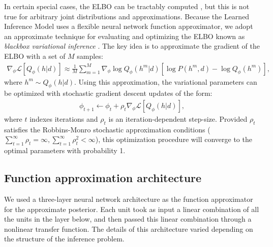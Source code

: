 In certain special cases, the ELBO can be tractably computed \citep[see][]{jordan1999introduction}, but this is not true for arbitrary joint distributions and approximations. Because the Learned Inference Model uses a flexible neural network function approximator, we adopt an approximate technique for evaluating and optimizing the ELBO known as \emph{blackbox variational inference} \citep{ranganath2014black}. The key idea is to approximate the gradient of the ELBO with a set of $M$ samples:
\begin{align}
    \nabla_\phi \mathcal{L}[Q_\phi(h|d)] \approx \frac{1}{M} \sum_{m=1}^M \nabla_\phi \log Q_\phi(h^m|d) \left[ \log P(h^m,d) - \log Q_\phi(h^m) \right],
\end{align}
where $h^m \sim Q_\phi(h|d)$. Using this approximation, the variational parameters can be optimized with stochastic gradient descent updates of the form:
\begin{align}
    \phi_{t+1} \leftarrow \phi_t + \rho_t \nabla_\phi \mathcal{L}[Q_\phi(h|d)],
\end{align}
where $t$ indexes iterations and $\rho_t$ is an iteration-dependent step-size. Provided $\rho_t$ satisfies the Robbins-Monro stochastic approximation conditions ($\sum_{t=1}^\infty \rho_t = \infty, \sum_{t=1}^\infty \rho_t^2 < \infty$), this optimization procedure will converge to the optimal parameters with probability 1.

\subsection{Function approximation architecture}

We used a three-layer neural network architecture as the function approximator for the approximate posterior. Each unit took as input a linear combination of all the units in the layer below, and then passed this linear combination through a nonlinear transfer function. The details of this architecture varied depending on the structure of the inference problem. 

